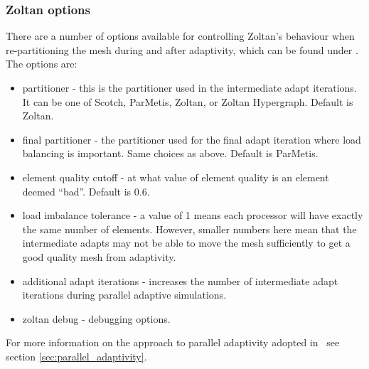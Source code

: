 \subsubsection{Zoltan options}
\label{sec:configuring_fluidity_zoltan_options}

There are a number of options available for controlling Zoltan's behaviour when re-partitioning the mesh during
and after adaptivity, which can be found under . The options are:
\begin{itemize}
\item partitioner - this is the partitioner used in the intermediate adapt iterations. It can be one of Scotch, ParMetis, Zoltan, or Zoltan Hypergraph. Default is Zoltan.
\item final partitioner - the partitioner used for the final adapt iteration where load balancing is important. Same choices as above. Default is ParMetis. 
\item element quality cutoff - at what value of element quality is an element deemed ``bad''. Default is 0.6.
\item load imbalance tolerance - a value of 1 means each processor will have exactly the same number of elements. However, smaller numbers here mean that the intermediate adapts may
not be able to move the mesh sufficiently to get a good quality mesh from adaptivity.
\item additional adapt iterations - increases the number of intermediate adapt iterations during parallel adaptive simulations.
\item zoltan debug - debugging options.
\end{itemize}

For more information on the approach to parallel adaptivity adopted in \fluidity\ see section \ref{sec:parallel_adaptivity}.
